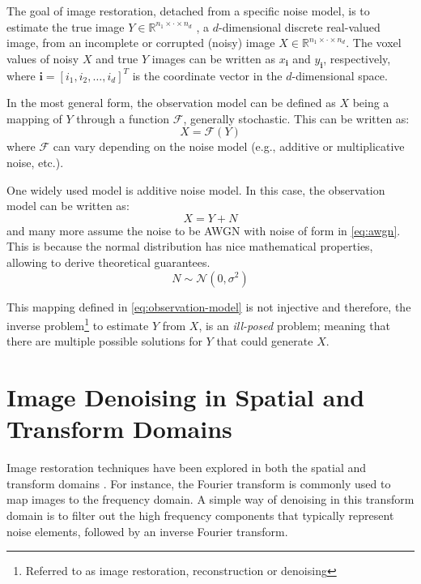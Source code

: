 The goal of image restoration, detached from a specific noise model, is to estimate the true image  $Y \in \mathbb{R}^{n_1 \times \cdot \times n_d}$ , a $d$-dimensional discrete real-valued image, from an incomplete or corrupted (noisy) image  $X \in \mathbb{R}^{n_1 \times \cdot \times n_d}$. The voxel values of noisy $X$ and true $Y$ images can be written as $x_{\mathbf{i}}$ and $y_{\mathbf{i}}$, respectively, where $\mathbf{i} = [i_1, i_2, \dots, i_d]^T$ is the coordinate vector in the $d$-dimensional space.

In the most general form, the observation model can be defined as $X$ being a mapping of $Y$ through a function $\mathcal{F}$, generally stochastic. This can be written as:
\begin{equation}\label{eq:observation-model}
    X = \mathcal{F} (Y)
\end{equation}
where $\mathcal{F}$ can vary depending on the noise model (e.g., additive or multiplicative noise, etc.).


One widely used model is additive noise model. In this case, the observation model can be written as:
\begin{equation}\label{eq:observation-model-additive}
    X = Y + N
\end{equation}
and many more assume the noise to be \gls{AWGN} with noise of form in \cref{eq:awgn}. This is because the normal distribution has nice mathematical properties, allowing to derive theoretical guarantees.
\begin{equation}\label{eq:awgn}
    N \sim \mathcal{N}(0, \sigma^2)
\end{equation}

This mapping defined in \cref{eq:observation-model} is not injective and therefore, the inverse problem\footnote{Referred to as image restoration, reconstruction or denoising} to estimate $Y$ from $X$, is an \textit{ill-posed} problem; meaning that there are multiple possible solutions for $Y$ that could generate $X$.

\section{Image Denoising in Spatial and Transform Domains}
Image restoration techniques have been explored in both the spatial and transform domains \cite{buadesReviewImageDenoising2005,diwakarReviewCTImage2018}. For instance, the Fourier transform is commonly used to map images to the frequency domain. A simple way of denoising in this transform domain is to filter out the high frequency components that typically represent noise elements, followed by an inverse Fourier transform.

